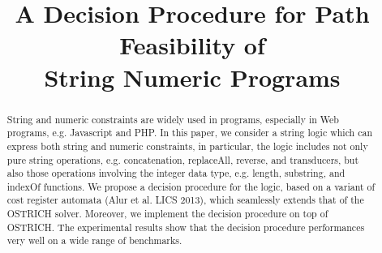 \documentclass{llncs}
\title{A Decision Procedure for Path Feasibility of \\
String Numeric Programs}
\author{}
\institute{ }
\begin{document}
%
%

\maketitle

\begin{abstract}
String and numeric constraints are widely used in programs, especially in Web programs, e.g. Javascript and PHP. 
In this paper, we consider a string logic which can express both string and numeric constraints, in particular, the logic includes not only pure string operations, e.g. concatenation, replaceAll, reverse, and transducers, but also those operations involving the integer data type, e.g. length, substring, and indexOf functions.  
We propose a decision procedure for the logic, based on a variant of cost register automata (Alur et al. LICS 2013), which seamlessly extends that of the OSTRICH solver. Moreover, we implement the decision procedure on top of OSTRICH. The experimental results show that the decision procedure performances very well on a wide range of benchmarks. 
\end{abstract}

%
%
\end{document}
